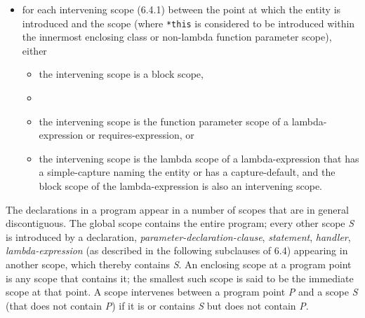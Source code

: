 \begin{modification}
\begin{itemize}[label=\textemdash]

\item
for each intervening scope (6.4.1) between the point at which the entity is introduced and the scope
(where \texttt{*this} is considered to be introduced within the innermost enclosing class or non-lambda function
parameter scope), either

\begin{itemize}[label=\textemdash]

\item
the intervening scope is a block scope,

\item
{}

\item
the intervening scope is the function parameter scope of a lambda-expression or requires-expression,
or

\item
the intervening scope is the lambda scope of a lambda-expression that has a simple-capture naming
the entity or has a capture-default, and the block scope of the lambda-expression is also an intervening
scope.
\end{itemize}
\end{itemize}
\end{modification}

\begin{modification}
The declarations in a program appear in a number of scopes that are in general discontiguous. The global scope
contains the entire program; every other scope \emph{S} is introduced by a
declaration, \emph{parameter-declaration-clause},
\emph{statement}, \emph{handler}, 
\emph{lambda-expression} (as described in the following subclauses of 6.4)
appearing in another scope, which thereby contains \emph{S}. An enclosing scope at a program point is any scope
that contains it; the smallest such scope is said to be the immediate scope at that point. A scope intervenes
between a program point \emph{P} and a scope \emph{S} (that does not contain
\emph{P}) if it is or contains \emph{S} but does not
contain \emph{P}.
\end{modification}

